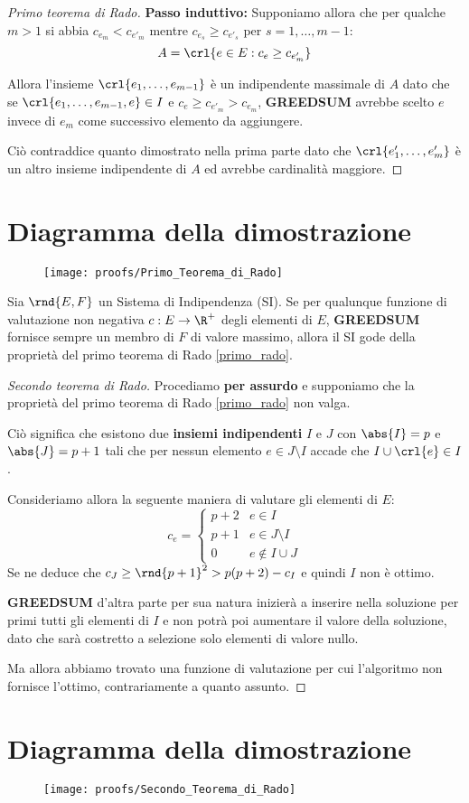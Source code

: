 \documentclass[\main/main.tex]{subfiles}
\begin{document}
\begin{proof}[Primo teorema di Rado]
  \textbf{Passo induttivo:} Supponiamo allora che per qualche \(m>1\) si abbia \(c_{e_m} < c_{e'_m}\) mentre \(c_{e_s} \geq c_{e'_s}\) per \(s = 1, \ldots, m-1\):
  \[A = \crl{e \in E: c_{e} \geq c_{e'_m}}\]

  Allora l'insieme \(\crl{e_1, \ldots, e_{m-1}}\) è un indipendente massimale di \(A\) dato che se \(\crl{e_1, \ldots, e_{m-1}, e} \in I\) e \(c_{e} \geq c_{e'_m} > c_{e_m}\), \textbf{GREEDSUM} avrebbe scelto \(e\) invece di \(e_m\) come successivo elemento da aggiungere.

  Ciò contraddice quanto dimostrato nella prima parte dato che \(\crl{e'_1, \ldots, e'_m}\) è un altro insieme indipendente di \(A\) ed avrebbe cardinalità maggiore.
\end{proof}
\clearpage
\section{Diagramma della dimostrazione}
\begin{figure}
  \texttt{[image: proofs/Primo\_Teorema\_di\_Rado]}
\end{figure}
\clearpage
\begin{theorem}
  Sia \(\rnd{E, F}\) un Sistema di Indipendenza (SI). Se per qualunque funzione di valutazione non negativa \(c: E \rightarrow \R^+\) degli elementi di \(E\), \textbf{GREEDSUM} fornisce sempre un membro di \(F\) di valore massimo, allora il SI gode della proprietà del primo teorema di Rado \ref{primo_rado}.
\end{theorem}
\begin{proof}[Secondo teorema di Rado]
  Procediamo \textbf{per assurdo} e supponiamo che la proprietà del primo teorema di Rado \ref{primo_rado} non valga.

  Ciò significa che esistono due \textbf{insiemi indipendenti} \(I\) e \(J\) con \(\abs{I} = p\) e \(\abs{J} = p+1\) tali che per nessun elemento \(e \in J \setminus I\) accade che \(I \cup \crl{e} \in I\).

  Consideriamo allora la seguente maniera di valutare gli elementi di \(E\):
  \[
    c_{e} = \begin{cases}
      p+2 & e \in I            \\
      p+1 & e \in J\setminus I \\
      0   & e \not\in I \cup J
    \end{cases}
  \]
  Se ne deduce che \(c_J \geq \rnd{p+1}^2 > p(p+2) - c_I\) e quindi \(I\) non è ottimo.

  \textbf{GREEDSUM} d'altra parte per sua natura inizierà a inserire nella soluzione per primi tutti gli elementi di \(I\) e non potrà poi aumentare il valore della soluzione, dato che sarà costretto a selezione solo elementi di valore nullo.

  Ma allora abbiamo trovato una funzione di valutazione per cui l'algoritmo non fornisce l'ottimo, contrariamente a quanto assunto.
\end{proof}
\clearpage
\section{Diagramma della dimostrazione}
\begin{figure}
  \texttt{[image: proofs/Secondo\_Teorema\_di\_Rado]}
\end{figure}
\end{document}
